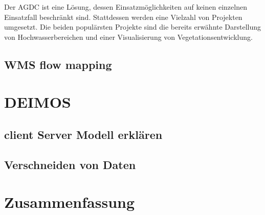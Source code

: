 \documentclass[10pt,conference,compsocconf]{IEEEtran}
\begin{document}
Der AGDC ist eine Lösung, dessen Einsatzmöglichkeiten auf keinen einzelnen Einsatzfall beschränkt sind. Stattdessen werden eine Vielzahl von Projekten umgesetzt. Die beiden populärsten Projekte sind die bereits erwähnte Darstellung von Hochwasserbereichen und einer Visualisierung von Vegetationsentwicklung\cite{agdc2}.

\subsection{WMS flow mapping}


\cite{wms_flow_mapping}



\section{DEIMOS}

\subsection{client Server Modell erklären}
%

\subsection{Verschneiden von Daten}


\section{Zusammenfassung}






\end{document}
